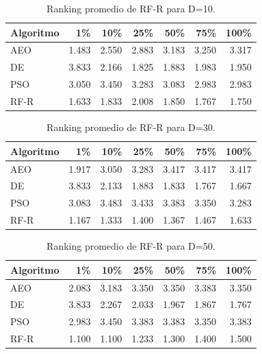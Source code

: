 \documentclass[11pt,a4paper]{article}
\begin{document}
\begin{table}[h!]
\centering \caption{Ranking promedio de RF-R para D=10.} \label{tab:rfr_d10}
\begin{tabular}{lrrrrrr} 
    \toprule Algoritmo & 1\% & 10\% & 25\% & 50\% & 75\% & 100\% \\ 
    \midrule AEO  & 1.483 & 2.550 & 2.883 & 3.183 & 3.250 & 3.317 \\ 
    DE   & 3.833 & 2.166 & 1.825 & 1.883 & 1.983 & 1.950 \\ 
    PSO  & 3.050 & 3.450 & 3.283 & 3.083 & 2.983 & 2.983 \\ 
    RF-R & 1.633 & 1.833 & 2.008 & 1.850 & 1.767 & 1.750 \\ 
    \bottomrule \end{tabular} \end{table}
\begin{table}[h!]
\centering \caption{Ranking promedio de RF-R para D=30.} \label{tab:rfr_d30}
\begin{tabular}{lrrrrrr} 
    \toprule Algoritmo & 1\% & 10\% & 25\% & 50\% & 75\% & 100\% \\ 
    \midrule AEO  & 1.917 & 3.050 & 3.283 & 3.417 & 3.417 & 3.417 \\ 
    DE   & 3.833 & 2.133 & 1.883 & 1.833 & 1.767 & 1.667 \\ 
    PSO  & 3.083 & 3.483 & 3.433 & 3.383 & 3.350 & 3.283 \\ 
    RF-R & 1.167 & 1.333 & 1.400 & 1.367 & 1.467 & 1.633 \\ 
    \bottomrule \end{tabular} \end{table}
\begin{table}[h!]
\centering \caption{Ranking promedio de RF-R para D=50.} \label{tab:rfr_d50}
\begin{tabular}{lrrrrrr} 
    \toprule Algoritmo & 1\% & 10\% & 25\% & 50\% & 75\% & 100\% \\ 
    \midrule AEO  & 2.083 & 3.183 & 3.350 & 3.350 & 3.383 & 3.350 \\ 
    DE   & 3.833 & 2.267 & 2.033 & 1.967 & 1.867 & 1.767 \\ 
    PSO  & 2.983 & 3.450 & 3.383 & 3.383 & 3.350 & 3.383 \\ 
    RF-R & 1.100 & 1.100 & 1.233 & 1.300 & 1.400 & 1.500 \\ 
    \bottomrule \end{tabular} \end{table}
\end{document}
